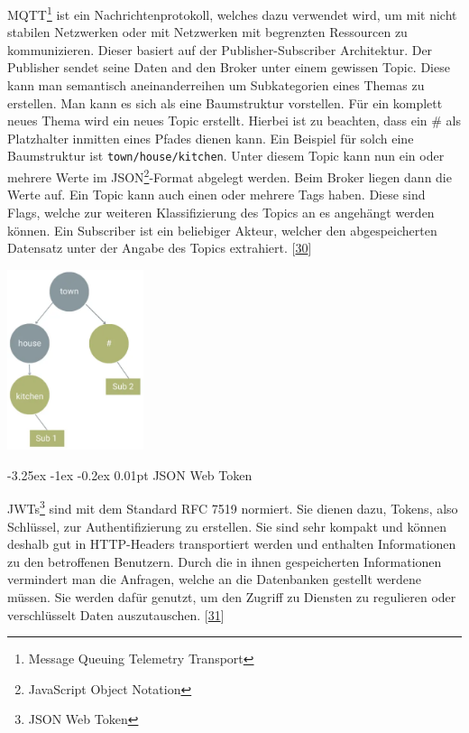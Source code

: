 \documentclass[
    headings=optiontotocandhead,%
    twoside,
    numbers=noenddot,%
    12pt, %
    titlepage, %
    parskip=full, %
    listof=leveldown, 
    numbers=noenddot, %
    a4paper,DIV=14,
    BCOR=15mm,
]{scrbook}
\makeatletter
\newcommand{\passthrough}[1]{#1}
\let\origfigure=\figure
\let\endorigfigure=\endfigure
\renewenvironment{figure}[1][]{%
   \origfigure[H]
}{%
   \endorigfigure
}
\renewcommand\paragraph{\@startsection{paragraph}{4}{\z@}%
    {-3.25ex \@plus -1ex \@minus -0.2ex}%
    {0.01pt}%
    {\raggedsection\normalfont\sectfont\nobreak\size@paragraph}%
  }
\makeatother
\begin{document}
MQTT\footnote{Message Queuing Telemetry Transport} ist ein
Nachrichtenprotokoll, welches dazu verwendet wird, um mit nicht stabilen
Netzwerken oder mit Netzwerken mit begrenzten Ressourcen zu
kommunizieren. Dieser basiert auf der Publisher-Subscriber Architektur.
Der Publisher sendet seine Daten and den Broker unter einem gewissen
Topic. Diese kann man semantisch aneinanderreihen um Subkategorien eines
Themas zu erstellen. Man kann es sich als eine Baumstruktur vorstellen.
Für ein komplett neues Thema wird ein neues Topic erstellt. Hierbei ist
zu beachten, dass ein \# als Platzhalter inmitten eines Pfades dienen
kann. Ein Beispiel für solch eine Baumstruktur ist
\passthrough{\lstinline!town/house/kitchen!}. Unter diesem Topic kann
nun ein oder mehrere Werte im JSON\footnote{JavaScript Object Notation}-Format
abgelegt werden. Beim Broker liegen dann die Werte auf. Ein Topic kann
auch einen oder mehrere Tags haben. Diese sind Flags, welche zur
weiteren Klassifizierung des Topics an es angehängt werden können. Ein
Subscriber ist ein beliebiger Akteur, welcher den abgespeicherten
Datensatz unter der Angabe des Topics extrahiert.
{[}\protect\hyperlink{ref-mqtt-hivemq}{30}{]}

\begin{figure}
\centering
\includegraphics[width=0.3\textwidth,height=\textheight]{img/Schrempf/mqtt-topic-structure.png}
\caption{Beispiel MQTT Topic Structure
{[}\protect\hyperlink{ref-mqtt-hivemq}{30}{]}}
\end{figure}

\hypertarget{json-web-token}{%
\paragraph{JSON Web Token}\label{json-web-token}}

JWTs\footnote{JSON Web Token} sind mit dem Standard RFC 7519 normiert.
Sie dienen dazu, Tokens, also Schlüssel, zur Authentifizierung zu
erstellen. Sie sind sehr kompakt und können deshalb gut in HTTP-Headers
transportiert werden und enthalten Informationen zu den betroffenen
Benutzern. Durch die in ihnen gespeicherten Informationen vermindert man
die Anfragen, welche an die Datenbanken gestellt werdene müssen. Sie
werden dafür genutzt, um den Zugriff zu Diensten zu regulieren oder
verschlüsselt Daten auszutauschen. {[}\protect\hyperlink{ref-jwt}{31}{]}
\end{document}
